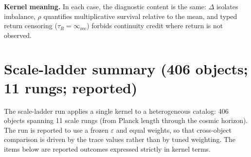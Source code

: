 \documentclass[
  aps,
  prd,
  preprint,
  superscriptaddress,
  nofootinbib,
  floatfix
]{revtex4-2}
\newcommand{\Rinf}{\infty_{\mathrm{rec}}}
\begin{document}
\noindent\textbf{Kernel meaning.}
In each case, the diagnostic content is the same: $\Delta$ isolates imbalance, $\rho$ quantifies multiplicative survival
relative to the mean, and typed return censoring ($\tau_R=\Rinf$) forbids continuity credit where return is not observed.

\section{Scale-ladder summary (406 objects; 11 rungs; reported)}
\label{sec:scale_ladder}

The scale-ladder run applies a single kernel to a heterogeneous catalog: 406 objects spanning 11 scale rungs
(from Planck length through the cosmic horizon). The run is reported to use a frozen $\varepsilon$ and equal weights,
so that cross-object comparison is driven by the trace values rather than by tuned weighting.
The items below are reported outcomes expressed strictly in kernel terms.
\end{document}
